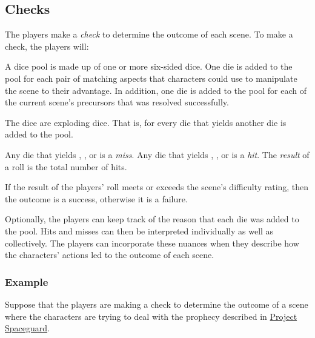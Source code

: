 \documentclass[12pt, a5paper, parskip=half-, footheight=1.4cm]{scrartcl}
\begin{document}
\subsection*{Checks} \label{subsection:checks}
The players make a \emph{check} to determine the outcome of each scene.
To make a check, the players will:
\begin{description}[labelindent=0.25cm, leftmargin=\widthof{\hspace{0.25cm}\textbullet\space}, font=\normalfont\textbullet\bfseries\space]%
\item[Assemble a Dice Pool:]
     A dice pool is made up of one or more six-sided dice.
     One die is added to the pool for each pair of matching aspects that characters could use to manipulate the scene to their advantage.
     In addition, one die is added to the pool for each of the current scene's precursors that was resolved successfully.
 \item[Roll the Dice:]
     The dice are exploding dice.
     That is, for every die that yields  another die is added to the pool.
\item[Compute the Result:]
     Any die that yields , , or  is a \emph{miss}.
     Any die that yields , , or  is a \emph{hit}.
     The \emph{result} of a roll is the total number of hits.
\item[Determine the Outcome:]
     If the result of the players' roll meets or exceeds the scene's difficulty rating, then the outcome is a success,
     otherwise it is a failure.
 \end{description}
\bigskip
Optionally, the players can keep track of the reason that each die was added to the pool.  Hits and misses can then be interpreted individually as well as collectively.  The players can incorporate these nuances when they describe how the  characters' actions led to the outcome of each scene.
\newpage

\subsubsection*{Example} \label{example:checks}
Suppose that the players are making a check to determine the outcome of a scene where the characters are trying to deal with the prophecy described in \hyperref[subsection:project-spaceguard]{\cinzel \small Project Spaceguard}.
\end{document}
